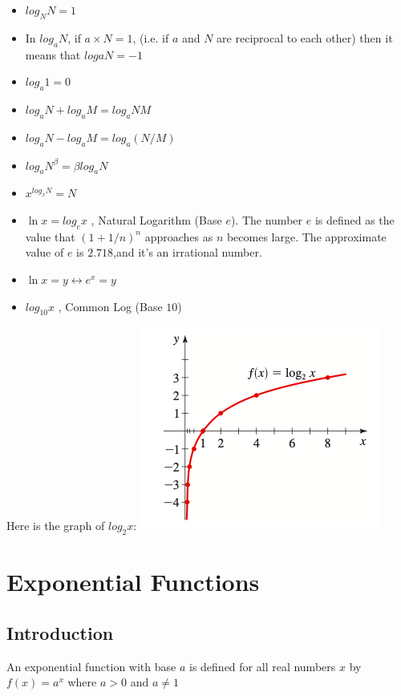 \documentclass{book}
\begin{document}
	\begin{itemize}
		\item $log_NN = 1$
		\item In $log_aN$, if $a \times N =1$, (i.e. if $a$ and $N$ are reciprocal to each other) then it means that $logaN = -1$ 
		\item $log_a1 = 0$
		\item $log_aN + log_aM = log_a{NM}$
		\item $log_aN - log_aM = log_a{(N/M)}$
		\item $log_aN^\beta = \beta log_aN$
		\item$x^{log_xN} = N$
		\item $\ln x = log_ex$ , Natural Logarithm (Base $e$). The number $e$ is defined as the value that $(1 + 1/n)^n$ approaches as $n$ becomes large. The approximate value of $e$ is $2.718$,and it's an irrational number.
		\item $\ln x = y \leftrightarrow e^x = y$
		\item $log_{10}x$ , Common Log (Base $10$)
	\end{itemize}
	
	Here is the graph of $log_2x$: 
	\includegraphics[scale=0.6]{loggraph}

	\chapter{Exponential Functions}
	
	
	\section{Introduction}
	\begin{mdframed}[backgroundcolor=yellow]
		An exponential function with base $a$ is defined for all real numbers $x$ by $f(x) = a^x$ where $a>0$ and $a \neq 1$
	\end{mdframed}
	
\end{document}
